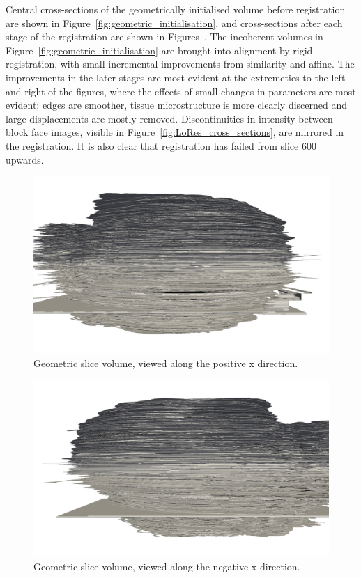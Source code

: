 	Central cross-sections of the geometrically initialised volume before registration are shown in Figure~\ref{fig:geometric_initialisation}, and cross-sections after each stage of the registration are shown in Figures~. The incoherent volumes in Figure~\ref{fig:geometric_initialisation} are brought into alignment by rigid registration, with small incremental improvements from similarity and affine. The improvements in the later stages are most evident at the extremeties to the left and right of the figures, where the effects of small changes in parameters are most evident; edges are smoother, tissue microstructure is more clearly discerned and large displacements are mostly removed. Discontinuities in intensity between block face images, visible in Figure~\ref{fig:LoRes_cross_sections}, are mirrored in the registration. It is also clear that registration has failed from slice 600 upwards.
	
	\begin{figure}
	  \centering
	  \includegraphics[width=0.9\textheight]{Ch7/Figs/Rat28/contours/whole_positive_x_geometric}
	  \caption{Geometric slice volume, viewed along the positive x direction.}
	  \label{fig:positive_x_geometric_contour}
	\end{figure}

	\begin{figure}
	  \centering
	  \includegraphics[width=0.9\textheight]{Ch7/Figs/Rat28/contours/whole_negative_x_geometric}
	  \caption{Geometric slice volume, viewed along the negative x direction.}
	  \label{fig:negative_x_geometric_contour}
	\end{figure}

